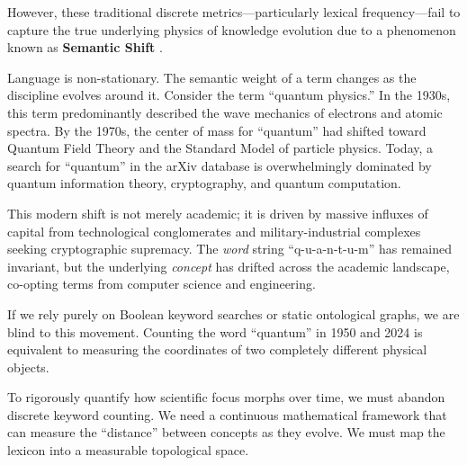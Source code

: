 However, these traditional discrete metrics—particularly lexical frequency—fail to capture the true underlying physics of knowledge evolution due to a phenomenon known as \textbf{Semantic Shift} \cite{Hamilton2018}.

Language is non-stationary. The semantic weight of a term changes as the discipline evolves around it. Consider the term ``quantum physics.'' In the 1930s, this term predominantly described the wave mechanics of electrons and atomic spectra. By the 1970s, the center of mass for ``quantum'' had shifted toward Quantum Field Theory and the Standard Model of particle physics. Today, a search for ``quantum'' in the arXiv database is overwhelmingly dominated by quantum information theory, cryptography, and quantum computation.

This modern shift is not merely academic; it is driven by massive influxes of capital from technological conglomerates and military-industrial complexes seeking cryptographic supremacy. The \textit{word} string ``q-u-a-n-t-u-m'' has remained invariant, but the underlying \textit{concept} has drifted across the academic landscape, co-opting terms from computer science and engineering.

If we rely purely on Boolean keyword searches or static ontological graphs, we are blind to this movement. Counting the word ``quantum'' in 1950 and 2024 is equivalent to measuring the coordinates of two completely different physical objects.

To rigorously quantify how scientific focus morphs over time, we must abandon discrete keyword counting. We need a continuous mathematical framework that can measure the ``distance'' between concepts as they evolve. We must map the lexicon into a measurable topological space.






